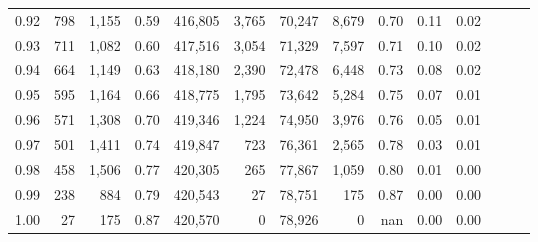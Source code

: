 \begin{tabular}{rrrrrrrrrrrrrr}
0.92 &    798 &  1,155 &  0.59 &  416,805 &    3,765 &  70,247 &   8,679 &  0.70 &  0.11 &      0.02 \\
0.93 &    711 &  1,082 &  0.60 &  417,516 &    3,054 &  71,329 &   7,597 &  0.71 &  0.10 &      0.02 \\
0.94 &    664 &  1,149 &  0.63 &  418,180 &    2,390 &  72,478 &   6,448 &  0.73 &  0.08 &      0.02 \\
0.95 &    595 &  1,164 &  0.66 &  418,775 &    1,795 &  73,642 &   5,284 &  0.75 &  0.07 &      0.01 \\
0.96 &    571 &  1,308 &  0.70 &  419,346 &    1,224 &  74,950 &   3,976 &  0.76 &  0.05 &      0.01 \\
0.97 &    501 &  1,411 &  0.74 &  419,847 &      723 &  76,361 &   2,565 &  0.78 &  0.03 &      0.01 \\
0.98 &    458 &  1,506 &  0.77 &  420,305 &      265 &  77,867 &   1,059 &  0.80 &  0.01 &      0.00 \\
0.99 &    238 &    884 &  0.79 &  420,543 &       27 &  78,751 &     175 &  0.87 &  0.00 &      0.00 \\
1.00 &     27 &    175 &  0.87 &  420,570 &        0 &  78,926 &       0 &   nan &  0.00 &      0.00 \\
\bottomrule
\end{tabular}
